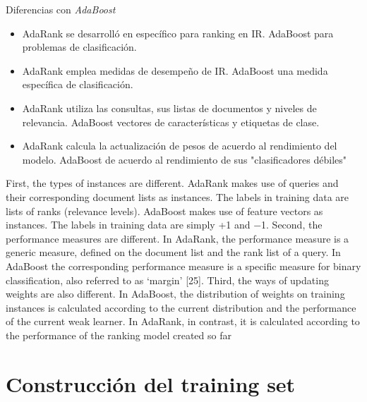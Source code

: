 \documentclass{beamer}
\begin{document}
\begin{frame}{Diferencias con \textit{AdaBoost}}
    \begin{itemize}
        \item AdaRank se desarrolló en específico para ranking en IR. AdaBoost para problemas de clasificación.
        \item AdaRank emplea medidas de desempeño de IR. AdaBoost una medida específica de clasificación.
        \item AdaRank utiliza las consultas, sus listas de documentos y niveles de relevancia. AdaBoost vectores de características y etiquetas de clase.
        \item AdaRank calcula la actualización de pesos de acuerdo al rendimiento del modelo. AdaBoost de acuerdo al rendimiento de sus "clasificadores débiles"
    \end{itemize}

    \begin{note}
        {First, the types of instances are different. AdaRank makes use of queries and their corresponding document lists as instances. The labels in training data are lists of ranks (relevance levels). AdaBoost makes use of feature vectors as instances. The labels in training data are simply +1 and −1. Second, the performance measures are different. In AdaRank, the performance measure is a generic measure, defined on the document list and the rank list of a query. In AdaBoost the corresponding performance measure is a specific measure for binary classification, also referred to as ‘margin’ [25]. Third, the ways of updating weights are also different. In AdaBoost, the distribution of weights on training instances is calculated according to the current distribution and the performance of the current weak learner. In AdaRank, in contrast, it is calculated according to the performance of the ranking model created so far}
    \end{note}
\end{frame}


\section{Construcción del training set}
\end{document}
